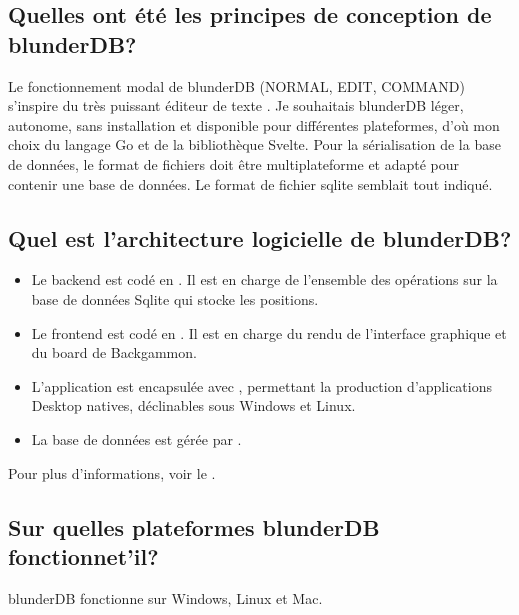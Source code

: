 \documentclass[letterpaper,10pt,french]{sphinxmanual}
\begin{document}
\subsection{Quelles ont été les principes de conception de blunderDB?}
\label{\detokenize{faq:quelles-ont-ete-les-principes-de-conception-de-blunderdb}}
\sphinxAtStartPar
Le fonctionnement modal de blunderDB (NORMAL, EDIT, COMMAND) s’inspire du très
puissant éditeur de texte . Je souhaitais blunderDB
léger, autonome, sans installation et disponible pour différentes plateformes,
d’où mon choix du langage Go et de la bibliothèque Svelte. Pour la
sérialisation de la base de données, le format de fichiers doit être
multi\sphinxhyphen{}plateforme et adapté pour contenir une base de données. Le format de
fichier sqlite semblait tout indiqué.


\subsection{Quel est l’architecture logicielle de blunderDB?}
\label{\detokenize{faq:quel-est-l-architecture-logicielle-de-blunderdb}}\begin{itemize}
\item {} 
\sphinxAtStartPar
Le backend est codé en . Il est en charge de
l’ensemble des opérations sur la base de données Sqlite qui stocke les
positions.

\item {} 
\sphinxAtStartPar
Le frontend est codé en . Il est en charge du
rendu de l’interface graphique et du board de Backgammon.

\item {} 
\sphinxAtStartPar
L’application est encapsulée avec , permettant la
production d’applications Desktop natives, déclinables sous Windows et Linux.

\item {} 
\sphinxAtStartPar
La base de données est gérée par .

\end{itemize}

\sphinxAtStartPar
Pour plus d’informations, voir le .


\subsection{Sur quelles plateformes blunderDB fonctionne\sphinxhyphen{}t’il?}
\label{\detokenize{faq:sur-quelles-plateformes-blunderdb-fonctionne-t-il}}
\sphinxAtStartPar
blunderDB fonctionne sur Windows, Linux et Mac.
\end{document}
